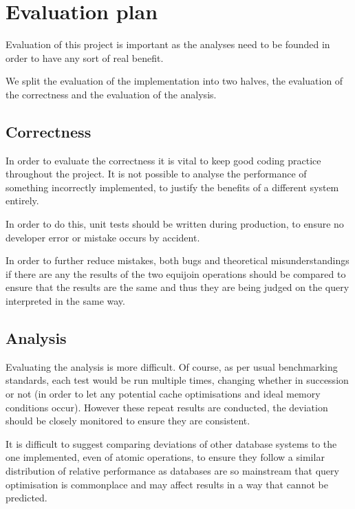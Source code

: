 \chapter{Evaluation plan} %
\begin{comment}
Project evaluation is very important, so it's important to think now about how you plan to measure success. For example, what functionality do you need to demonstrate?  What experiments to you need to undertake and what outcome(s) would constitute success?  What benchmarks should you use? How has your project extended the state of the art?  How do you measure qualitative aspects, such as ease of use?  These are the sort of questions that your project evaluation should address; this section should outline your plan.
\end{comment}
Evaluation of this project is important as the analyses need to be founded in order to have any sort of real benefit.

We split the evaluation of the implementation into two halves, the evaluation of the correctness and the evaluation of the analysis.

\section{Correctness}\label{sec:correctnessevaluation}
In order to evaluate the correctness it is vital to keep good coding practice throughout the project. It is not possible to analyse the performance of something incorrectly implemented, to justify the benefits of a different system entirely.

In order to do this, unit tests should be written during production, to ensure no developer error or mistake occurs by accident.

In order to further reduce mistakes, both bugs and theoretical misunderstandings if there are any the results of the two equijoin operations should be compared to ensure that the results are the same and thus they are being judged on the query interpreted in the same way.

\section{Analysis}
Evaluating the analysis is more difficult. Of course, as per usual benchmarking standards, each test would be run multiple times, changing whether in succession or not (in order to let any potential cache optimisations and ideal memory conditions occur). However these repeat results are conducted, the deviation should be closely monitored to ensure they are consistent.

It is difficult to suggest comparing deviations of other database systems to the one implemented, even of atomic operations, to ensure they follow a similar distribution of relative performance as databases are so mainstream that query optimisation is commonplace and may affect results in a way that cannot be predicted.